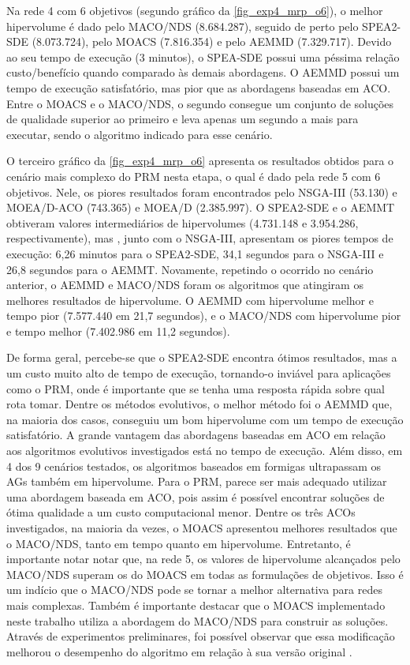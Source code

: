Na rede 4 com 6 objetivos (segundo gráfico da \autoref{fig_exp4_mrp_o6}), o melhor hipervolume é dado pelo MACO/NDS (8.684.287), seguido de perto pelo SPEA2-SDE (8.073.724), pelo MOACS (7.816.354) e pelo AEMMD (7.329.717). Devido ao seu tempo de execução (3 minutos), o SPEA-SDE possui uma péssima relação custo/benefício quando comparado às demais abordagens. O AEMMD possui um tempo de execução satisfatório, mas pior que as abordagens baseadas em ACO. Entre o MOACS e o MACO/NDS, o segundo consegue um conjunto de soluções de qualidade superior ao primeiro e leva apenas um segundo a mais para executar, sendo o algoritmo indicado para esse cenário.

O terceiro gráfico da \autoref{fig_exp4_mrp_o6} apresenta os resultados obtidos para o cenário mais complexo do PRM nesta etapa, o qual é dado pela rede 5 com 6 objetivos. Nele, os piores resultados foram encontrados pelo NSGA-III (53.130) e MOEA/D-ACO (743.365) e MOEA/D (2.385.997). O SPEA2-SDE e o AEMMT obtiveram valores intermediários de hipervolumes (4.731.148 e 3.954.286, respectivamente), mas , junto com o NSGA-III, apresentam os piores tempos de execução: 6,26 minutos para o SPEA2-SDE, 34,1 segundos para o NSGA-III e 26,8 segundos para o AEMMT. Novamente, repetindo o ocorrido no cenário anterior, o AEMMD e MACO/NDS foram os algoritmos que atingiram os melhores resultados de hipervolume. O AEMMD com hipervolume melhor e tempo pior (7.577.440 em 21,7 segundos), e o MACO/NDS com hipervolume pior e tempo melhor (7.402.986 em 11,2 segundos).

De forma geral, percebe-se que o SPEA2-SDE encontra ótimos resultados, mas a um custo muito alto de tempo de execução, tornando-o inviável para aplicações como o PRM, onde é importante que se tenha uma resposta rápida sobre qual rota tomar. Dentre os métodos evolutivos, o melhor método foi o AEMMD que, na maioria dos casos, conseguiu um bom hipervolume com um tempo de execução satisfatório. A grande vantagem das abordagens baseadas em ACO em relação aos algoritmos evolutivos investigados está no tempo de execução. Além disso, em 4 dos 9 cenários testados, os algoritmos baseados em formigas ultrapassam os AGs também em hipervolume. Para o PRM, parece ser mais adequado utilizar uma abordagem baseada em ACO, pois assim é possível encontrar soluções de ótima qualidade a um custo computacional menor. Dentre os três ACOs investigados, na maioria da vezes, o MOACS apresentou melhores resultados que o MACO/NDS, tanto em tempo quanto em hipervolume. Entretanto, é importante notar notar que, na rede 5, os valores de hipervolume alcançados pelo MACO/NDS superam os do MOACS em todas as formulações de objetivos. Isso é um indício que o MACO/NDS pode se tornar a melhor alternativa para redes mais complexas. Também é importante destacar que o MOACS implementado neste trabalho utiliza a abordagem do MACO/NDS para construir as soluções. Através de experimentos preliminares, foi possível observar que essa modificação melhorou o desempenho do algoritmo em relação à sua versão original \cite{Riveros2016}.


